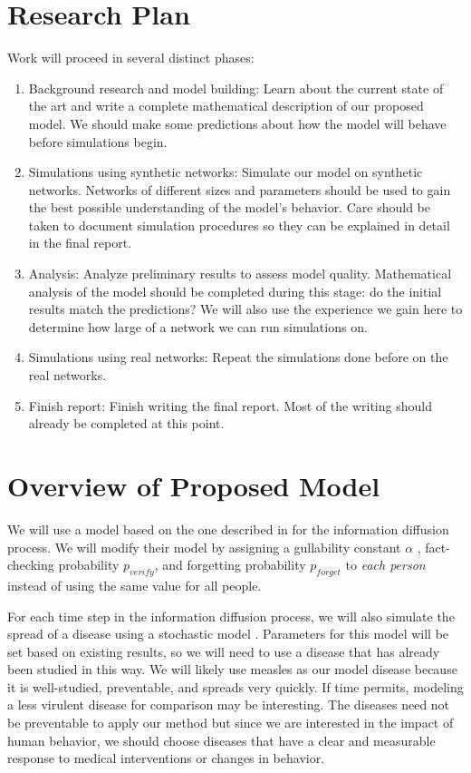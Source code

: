 \documentclass{article}
\begin{document}
\section{Research Plan}
Work will proceed in several distinct phases:
\begin{enumerate}
    \item Background research and model building: Learn about the current state of the art and write a complete mathematical description of our proposed model. We should make some predictions about how the model will behave before simulations begin.
    \item Simulations using synthetic networks: Simulate our model on synthetic networks. Networks of different sizes and parameters should be used to gain the best possible understanding of the model's behavior. Care should be taken to document simulation procedures so they can be explained in detail in the final report.
    \item Analysis: Analyze preliminary results to assess model quality. Mathematical analysis of the model should be completed during this stage: do the initial results match the predictions? We will also use the experience we gain here to determine how large of a network we can run simulations on.
    \item Simulations using real networks: Repeat the simulations done before on the real networks.
    \item Finish report: Finish writing the final report. Most of the writing should already be completed at this point.
\end{enumerate}

\section{Overview of Proposed Model}
We will use a model based on the one described in \cite{Tambuscio2015FactcheckingEO} for the information diffusion process. We will modify their model by assigning a gullability constant $\alpha$ , fact-checking probability $p_{verify}$, and forgetting probability $p_{forget}$ to \textit{each person} instead of using the same value for all people.

For each time step in the information diffusion process, we will also simulate the spread of a disease using a stochastic model . Parameters for this model will be set based on existing results, so we will need to use a disease that has already been studied in this way. We will likely use measles as our model disease because it is well-studied, preventable, and spreads very quickly. If time permits, modeling a less virulent disease for comparison may be interesting. The diseases need not be preventable to apply our method but since we are interested in the impact of human behavior, we should choose diseases that have a clear and measurable response to medical interventions or changes in behavior.
\end{document}
